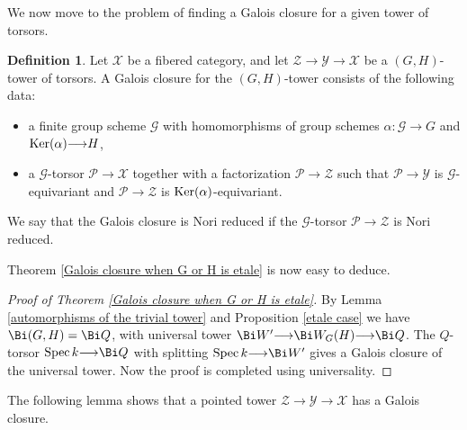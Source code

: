 \documentclass[12pt,reqno]{amsart}
\theoremstyle{plain}
\theoremstyle{definition}
\newtheorem{defn}[thm]{Definition}
\numberwithin{thm}{section}
\theoremstyle{plain}
\begin{document}
We now move to the problem of finding a Galois closure for a given tower of torsors.

\begin{defn}\label{Galois closure}
Let ${\mathcal{X}}$ be a fibered category, and let ${\mathcal{Z}}{\longrightarrow}{\mathcal{Y}}{\longrightarrow}{\mathcal{X}}$ be a $(G,H)$-tower of
torsors. A Galois closure for the $(G,H)$-tower consists of the following data:
\begin{itemize}
\item a finite group scheme ${\mathcal{G}}$ with homomorphisms of group schemes $\alpha\colon {\mathcal{G}}{\longrightarrow}
G$ and ${{\rm Ker}}(\alpha){\longrightarrow} H$,

\item a ${\mathcal{G}}$-torsor ${\mathcal{P}}{\longrightarrow} {\mathcal{X}}$ together with a factorization ${\mathcal{P}}{\longrightarrow} {\mathcal{Z}}$
such that ${\mathcal{P}}{\longrightarrow} {\mathcal{Y}}$ is ${\mathcal{G}}$-equivariant and ${\mathcal{P}}{\longrightarrow} {\mathcal{Z}}$ is
${{\rm Ker}}(\alpha)$-equivariant.
\end{itemize}
We say that the Galois closure is Nori reduced if the ${\mathcal{G}}$-torsor ${\mathcal{P}}{\longrightarrow} {\mathcal{Z}}$ is Nori reduced.
\end{defn}

Theorem \ref{Galois closure when G or H is etale} is now easy to deduce.

\begin{proof}[Proof of Theorem \ref{Galois closure when G or H is etale}]
 By Lemma \ref{automorphisms of the trivial tower} and Proposition
\ref{etale case} we have $\Bi(G,H)=\Bi Q$, with universal tower $\Bi W'{\longrightarrow}
\Bi W_G(H) {\longrightarrow} \Bi Q$. The $Q$-torsor ${{\rm Spec \,}} k{\longrightarrow} \Bi Q$ with splitting
${{\rm Spec \,}} k{\longrightarrow} \Bi W'$ gives a Galois closure of the universal tower. Now the
proof is completed using universality. 
\end{proof}

The following lemma shows that a pointed tower ${\mathcal{Z}}{\longrightarrow}{\mathcal{Y}}{\longrightarrow}{\mathcal{X}}$ has a Galois closure.
\end{document}
